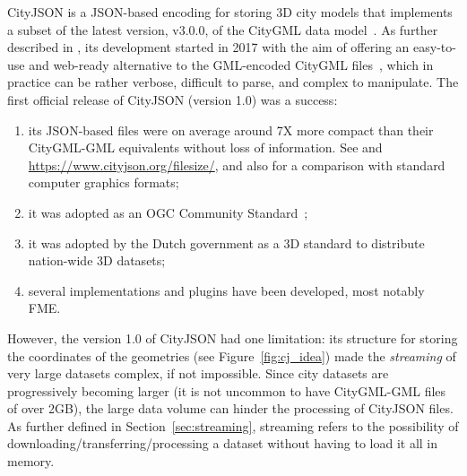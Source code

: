 \documentclass{isprs} %
\begin{document}
CityJSON is a JSON-based encoding for storing 3D city models that implements a subset of the latest version, v3.0.0, of the CityGML data model~\citep{OGC-CityGML3}.
As further described in \citet{19_ogdss_cityjson}, its development started in 2017 with the aim of offering an easy-to-use and web-ready alternative to the GML-encoded CityGML files~\citep{OGC-CityGML3-XML}, which in practice can be rather verbose, difficult to parse, and complex to manipulate.
The first official release of CityJSON (version 1.0) was a success: 
\begin{enumerate}
  \item its JSON-based files were on average around 7X more compact than their CityGML-GML equivalents without loss of information. See \citet{19_ogdss_cityjson} and \url{https://www.cityjson.org/filesize/}, and also \citet{Praschl23} for a comparison with standard computer graphics formats; 
  \item it was adopted as an OGC Community Standard~\citep{OGC-CityJSON-v10}; 
  \item it was adopted by the Dutch government as a 3D standard to distribute nation-wide 3D datasets; 
  \item several implementations and plugins have been developed, most notably FME\@.
\end{enumerate}



%

However, the version 1.0 of CityJSON had one limitation: its structure for storing the coordinates of the geometries (see Figure~\ref{fig:cj_idea}) made the \emph{streaming} of very large datasets complex, if not impossible.
Since city datasets are progressively becoming larger (it is not uncommon to have CityGML-GML files of over 2GB), the large data volume can hinder the processing of CityJSON files.
As further defined in Section~\ref{sec:streaming}, streaming refers to the possibility of downloading/transferring/processing a dataset without having to load it all in memory.

%
\end{document}

